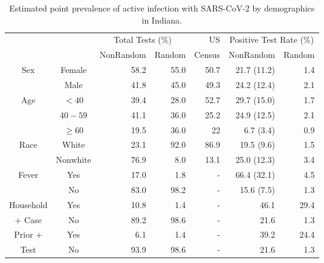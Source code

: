 \documentclass[12pt]{amsart}
\numberwithin{equation}{section}
\theoremstyle{plain}
\begin{document}
\begin{itemize}[leftmargin=*]
\begin{table}[th]
\begin{tabular}{c | c | r r | r | r r }
& & \multicolumn{2}{c}{Total Tests (\%)} & US & \multicolumn{2}{c}{Positive Test Rate (\%)}\\
\cline{3-4} \cline{6-7}
& & NonRandom & Random & Census & NonRandom & Random \\ \hline
\multirow{2}{*}{Sex} & Female & 58.2 & 55.0 & 50.7 & 21.7 (11.2) & 1.4 \\
& Male & 41.8 & 45.0 & 49.3 & 24.2 (12.4) & 2.1 \\ \hline
\multirow{3}{*}{Age} & $<40$ & 39.4 & 28.0 & 52.7 & 29.7 (15.0) & 1.7 \\
& $40-59$ & 41.1 & 36.0 & 25.2 & 24.9 (12.5) & 2.1 \\
& $\geq 60$ & 19.5 & 36.0 & 22 & 6.7 (3.4) & 0.9 \\ \hline
\multirow{2}{*}{Race} & White & 23.1 & 92.0 & 86.9 & 19.5 (9.6) & 1.5 \\
& Nonwhite & 76.9 & 8.0 & 13.1 & 25.0 (12.3) & 3.4 \\ \hline
\multirow{2}{*}{Fever} & Yes & 17.0 & 1.8 & - & 66.4 (32.1) & 4.5 \\
& No & 83.0 & 98.2 & - & 15.6 (7.5) & 1.3 \\ \hline
Household & Yes & 10.8 & 1.4 & - & 46.1 & 29.4 \\
$+$ Case & No & 89.2 & 98.6 & - & 21.6 & 1.3 \\ \hline
Prior $+$ & Yes & 6.1 & 1.4 & - & 39.2 & 24.4 \\
Test & No & 93.9 & 98.6 & - & 21.6 & 1.3 \\ \hline
\end{tabular}
\caption{Estimated point prevalence of active infection with SARS-CoV-2 by demographics in Indiana.}
\label{tab:indiana}
\end{table}


\end{itemize}
\end{document}
